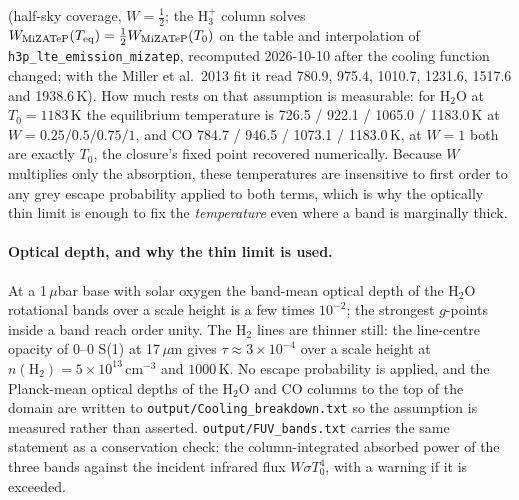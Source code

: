 \documentclass[english,a4paper]{my_memo}
\begin{document}
\noindent (half-sky coverage, $W=\tfrac12$; the H$_3^+$ column solves
$W_{\rm MiZATeP}(T_{\rm eq}) = \tfrac12 W_{\rm MiZATeP}(T_0)$ on the table and
interpolation of \texttt{h3p\_lte\_emission\_mizatep}, recomputed 2026-10-10 after
the cooling function changed; with the Miller et al.\ 2013 fit it read 780.9, 975.4,
1010.7, 1231.6, 1517.6 and 1938.6\,K). How much rests on that assumption
is measurable: for H$_2$O at $T_0=1183$\,K the equilibrium temperature is
726.5 / 922.1 / 1065.0 / 1183.0\,K at $W=0.25/0.5/0.75/1$, and CO 784.7 /
946.5 / 1073.1 / 1183.0\,K, at $W=1$ both are exactly $T_0$, the closure's
fixed point recovered numerically. Because $W$ multiplies only the
absorption, these temperatures are insensitive to first order to any grey escape
probability applied to both terms, which is why the optically thin limit is
enough to fix the \emph{temperature} even where a band is marginally thick.

\paragraph{Optical depth, and why the thin limit is used.}
At a 1\,$\mu$bar base with solar oxygen the band-mean optical depth of the
H$_2$O rotational bands over a scale height is a few times $10^{-2}$; the
strongest $g$-points inside a band reach order unity. The H$_2$ lines are
thinner still: the line-centre opacity of 0--0 S(1) at 17\,$\mu$m gives
$\tau\approx3\times10^{-4}$ over a scale height at
$n(\mathrm{H_2})=5\times10^{13}$\,cm$^{-3}$ and $1000$\,K. No escape probability
is applied, and the Planck-mean optical depths of the H$_2$O and CO columns to
the top of the domain are written to \texttt{output/Cooling\_breakdown.txt} so
the assumption is measured rather than asserted.
\texttt{output/FUV\_bands.txt} carries the same statement as a conservation
check: the column-integrated absorbed power of the three bands against the
incident infrared flux $W\sigma T_0^4$, with a warning if it is exceeded.
\end{document}
